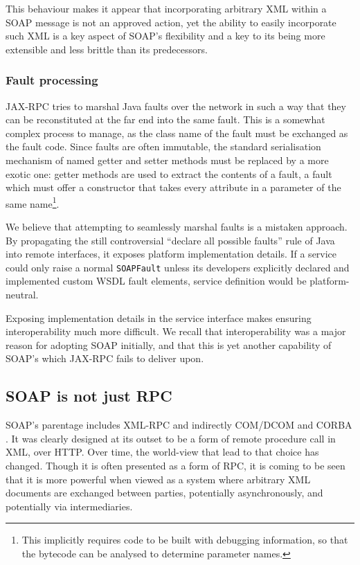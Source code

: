 This behaviour makes it appear that incorporating arbitrary XML within
a SOAP message is not an approved action, yet the ability to easily
incorporate such XML is a key aspect of SOAP's flexibility and a key
to its being more extensible and less brittle than its predecessors.

\subsubsection{Fault processing}
\label{objections:soap-not-rmi:faults}

JAX-RPC tries to marshal Java faults over the network in such a way
that they can be reconstituted at the far end into the same fault.
This is a somewhat complex process to manage, as the class name of the
fault must be exchanged as the fault code. Since faults are often
immutable, the standard serialisation mechanism of named getter and
setter methods must be replaced by a more exotic one: getter methods
are used to extract the contents of a fault, a fault which must offer
a constructor that takes every attribute in a parameter of the same
name\footnote{This implicitly requires code to be built with debugging
information, so that the bytecode can be analysed to determine
parameter names.}.

We believe that attempting to seamlessly marshal faults is a mistaken
approach.  By propagating the still controversial ``declare all
possible faults'' rule of Java into remote interfaces, it exposes
platform implementation details. If a service could only raise a
normal {\tt SOAPFault} unless its developers explicitly declared and
implemented custom WSDL fault elements, service definition would be
platform-neutral.


Exposing implementation details in the service interface makes ensuring
interoperability much more difficult. We recall that interoperability
was a major reason for adopting SOAP initially, and that this is yet
another capability of SOAP's which JAX-RPC fails to deliver upon.

\subsection{SOAP is not just RPC}
\label{objections:soap-not-just-rmi}

SOAP's parentage includes XML-RPC \cite{winer:xmlrpc} and indirectly COM/DCOM
and CORBA \cite{dbox:com, vinoski:CORBA}. It was clearly designed at its outset
to be a form of remote procedure call in XML, over HTTP. Over time, the
world-view that lead to that choice has changed. Though it is often presented as
a form of RPC, it is coming to be seen that it is more powerful when viewed as a
system where arbitrary XML documents are exchanged between parties, potentially
asynchronously, and potentially via intermediaries.

